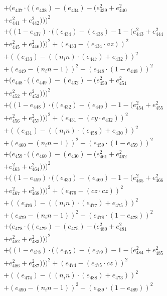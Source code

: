 \documentclass[10pt, a4paper]{article}
\begin{document}
\begin{align*}
& + (e_{437}  \cdot  ((e_{438}) - (e_{434}) - (e_{439}^{2} + e_{440}^{2} \\
& + e_{441}^{2} + e_{442}^{2})))^{2} \\
& + ((1 - e_{437})  \cdot  ((e_{434}) - (e_{438}) - 1 - (e_{443}^{2} + e_{444}^{2} \\
& + e_{445}^{2} + e_{446}^{2})))^{2} + (e_{433} - (e_{434}  \cdot  az))^{2} \\
& + ((e_{433}) - ((n_in)  \cdot  (e_{447}) + e_{432}))^{2} \\
& + (e_{449} - (n_in - 1))^{2} + (e_{448}  \cdot  (1 - e_{448}))^{2} \\
& + (e_{448}  \cdot  ((e_{449}) - (e_{432}) - (e_{450}^{2} + e_{451}^{2} \\
& + e_{452}^{2} + e_{453}^{2})))^{2} \\
& + ((1 - e_{448})  \cdot  ((e_{432}) - (e_{449}) - 1 - (e_{454}^{2} + e_{455}^{2} \\
& + e_{456}^{2} + e_{457}^{2})))^{2} + (e_{431} - (cy  \cdot  e_{432}))^{2} \\
& + ((e_{431}) - ((n_in)  \cdot  (e_{458}) + e_{430}))^{2} \\
& + (e_{460} - (n_in - 1))^{2} + (e_{459}  \cdot  (1 - e_{459}))^{2} \\
& + (e_{459}  \cdot  ((e_{460}) - (e_{430}) - (e_{461}^{2} + e_{462}^{2} \\
& + e_{463}^{2} + e_{464}^{2})))^{2} \\
& + ((1 - e_{459})  \cdot  ((e_{430}) - (e_{460}) - 1 - (e_{465}^{2} + e_{466}^{2} \\
& + e_{467}^{2} + e_{468}^{2})))^{2} + (e_{476} - (cz  \cdot  cz))^{2} \\
& + ((e_{476}) - ((n_in)  \cdot  (e_{477}) + e_{475}))^{2} \\
& + (e_{479} - (n_in - 1))^{2} + (e_{478}  \cdot  (1 - e_{478}))^{2} \\
& + (e_{478}  \cdot  ((e_{479}) - (e_{475}) - (e_{480}^{2} + e_{481}^{2} \\
& + e_{482}^{2} + e_{483}^{2})))^{2} \\
& + ((1 - e_{478})  \cdot  ((e_{475}) - (e_{479}) - 1 - (e_{484}^{2} + e_{485}^{2} \\
& + e_{486}^{2} + e_{487}^{2})))^{2} + (e_{474} - (e_{475}  \cdot  cz))^{2} \\
& + ((e_{474}) - ((n_in)  \cdot  (e_{488}) + e_{473}))^{2} \\
& + (e_{490} - (n_in - 1))^{2} + (e_{489}  \cdot  (1 - e_{489}))^{2} \\

\end{align*}
\end{document}
